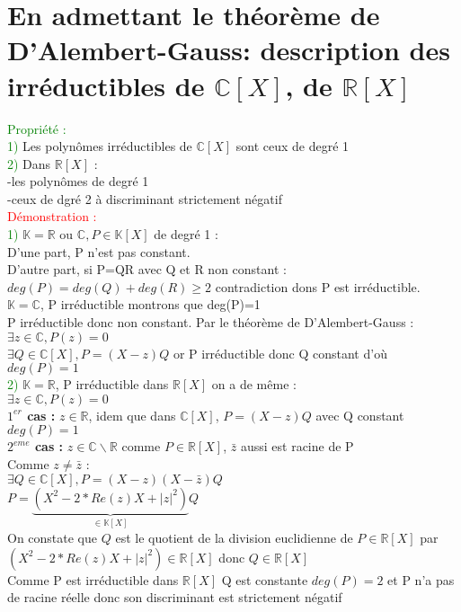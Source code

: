 \documentclass{article}
\begin{document}
\section{En admettant  le théorème de D'Alembert-Gauss: description des irréductibles de $\mathbb C [X]$, de $\mathbb R[X]$}
\textcolor{green}{Propriété :} \\
\textcolor{green}{1)} Les polynômes irréductibles de $\mathbb C [X]$ sont ceux de degré 1 \\
\textcolor{green}{2)} Dans $\mathbb R [X]$ : \\
 \indent -les polynômes de degré 1 \\
 \indent -ceux de dgré 2 à discriminant strictement négatif \\
 \textcolor{red}{Démonstration :} \\
\textcolor{green}{1)} $\mathbb  K = \mathbb{R}$ ou $\mathbb{C}, P \in \mathbb K[X]$ de degré 1 : \\
D'une part, P n'est pas constant. \\
D'autre part, si P=QR avec Q et R non constant : $deg(P)=deg(Q)+deg(R) \geq 2$ contradiction dons P est irréductible. \\
$\mathbb{K}= \mathbb C$, P irréductible montrons que deg(P)=1 \\
P irréductible donc non constant. Par le théorème de D'Alembert-Gauss : $\exists z \in \mathbb C, P(z)=0$ \\
$\exists Q \in \mathbb C [X], P=(X-z)Q$ or P irréductible donc Q constant d'où $deg(P)=1$ \\
\textcolor{green}{2)} $\mathbb K= \mathbb R$, P irréductible dans $ \mathbb R [X]$ on a de  même : \\
$\exists z \in \mathbb C, P(z)=0$ \\
{\bf $1^{er}$ cas :} $z\in \mathbb R$, idem que dans $\mathbb C[X]$, $P=(X-z)Q$ avec Q constant $deg(P)=1$ \\
{\bf $2^{eme}$ cas :} $z \in \mathbb C \backslash \mathbb R $ comme $P \in \mathbb R [X]$, $\bar{z}$ aussi est racine de P \\
Comme $z \neq \bar{z}$ : \\
$\exists Q \in \mathbb C [X],P=(X-z)(X-\bar{z})Q$ \\
$P=\underbrace{(X^2-2*Re(z)X+|z|^2)}_{\in \mathbb K [X]}Q$ \\
On constate que $Q$ est le quotient de la division euclidienne de $P \in \mathbb{R}[X]$ par $(X^2-2*Re(z)X+|z|^2) \in \mathbb R [X]$ donc $Q \in \mathbb{R}[X]$ \\
Comme P est irréductible dans $\mathbb{R}[X]$ Q est constante $deg(P)=2$ et P n'a pas de racine réelle donc son discriminant est strictement négatif
\end{document}
